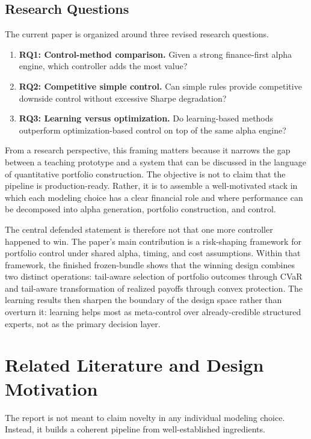 \documentclass[11pt]{article}
\begin{document}
\subsection{Research Questions}

The current paper is organized around three revised research questions.
\begin{enumerate}[leftmargin=1.5em, itemsep=2pt, topsep=4pt]
\item \textbf{RQ1: Control-method comparison.} Given a strong finance-first
      alpha engine, which controller adds the most value?
\item \textbf{RQ2: Competitive simple control.} Can simple rules provide
      competitive downside control without excessive Sharpe degradation?
\item \textbf{RQ3: Learning versus optimization.} Do learning-based methods
      outperform optimization-based control on top of the same alpha engine?
\end{enumerate}

From a research perspective, this framing matters because it narrows the gap
between a teaching prototype and a system that can be discussed in the language
of quantitative portfolio construction. The objective is not to claim that the
pipeline is production-ready. Rather, it is to assemble a well-motivated stack
in which each modeling choice has a clear financial role and where performance
can be decomposed into alpha generation, portfolio construction, and control.

The central defended statement is therefore not that one more controller happened to win. The paper's main contribution is a risk-shaping framework for portfolio control under shared alpha, timing, and cost assumptions. Within that framework, the finished frozen-bundle shows that the winning design combines two distinct operations: tail-aware selection of portfolio outcomes through CVaR and tail-aware transformation of realized payoffs through convex protection. The learning results then sharpen the boundary of the design space rather than overturn it: learning helps most as meta-control over already-credible structured experts, not as the primary decision layer.

\section{Related Literature and Design Motivation}

The report is not meant to claim novelty in any individual modeling choice.
Instead, it builds a coherent pipeline from well-established ingredients.
\end{document}
